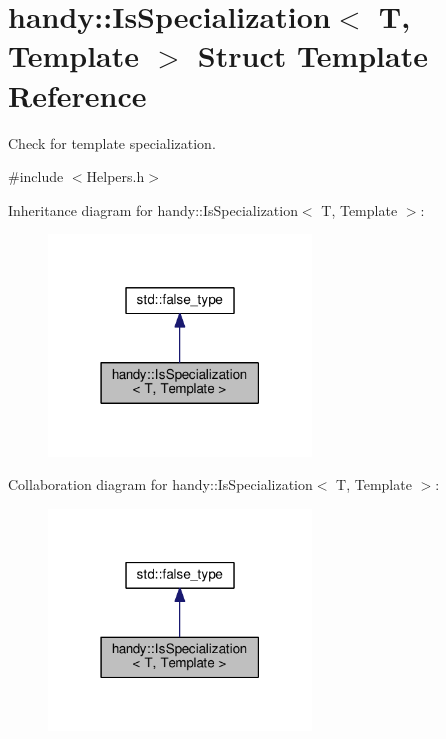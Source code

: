 \hypertarget{structhandy_1_1IsSpecialization}{}\section{handy\+:\+:Is\+Specialization$<$ T, Template $>$ Struct Template Reference}
\label{structhandy_1_1IsSpecialization}


Check for template specialization.  




{\ttfamily \#include $<$Helpers.\+h$>$}



Inheritance diagram for handy\+:\+:Is\+Specialization$<$ T, Template $>$\+:\nopagebreak
\begin{figure}[H]
\begin{center}
\leavevmode
\includegraphics[width=198pt]{structhandy_1_1IsSpecialization__inherit__graph}
\end{center}
\end{figure}


Collaboration diagram for handy\+:\+:Is\+Specialization$<$ T, Template $>$\+:\nopagebreak
\begin{figure}[H]
\begin{center}
\leavevmode
\includegraphics[width=198pt]{structhandy_1_1IsSpecialization__coll__graph}
\end{center}
\end{figure}


